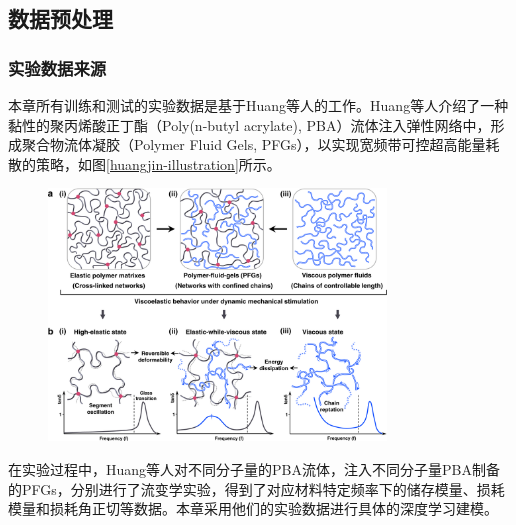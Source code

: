 \subsection{数据预处理}
\subsubsection{实验数据来源}
本章所有训练和测试的实验数据是基于Huang等人的工作\cite{huangUltrahighEnergydissipationElastomers2021}。Huang等人介绍了一种黏性的聚丙烯酸正丁酯（Poly(n-butyl acrylate), PBA）流体注入弹性网络中，形成聚合物流体凝胶（Polymer Fluid Gels, PFGs），以实现宽频带可控超高能量耗散的策略，如图\ref{huangjin-illustration}所示。
\begin{figure}[htbp]
  \centering
  \includegraphics[width=0.8\textwidth]{Fig/huangjin.png}
\end{figure}
在实验过程中，Huang等人对不同分子量的PBA流体，注入不同分子量PBA制备的PFGs，分别进行了流变学实验，得到了对应材料特定频率下的储存模量、损耗模量和损耗角正切等数据。本章采用他们的实验数据进行具体的深度学习建模。

